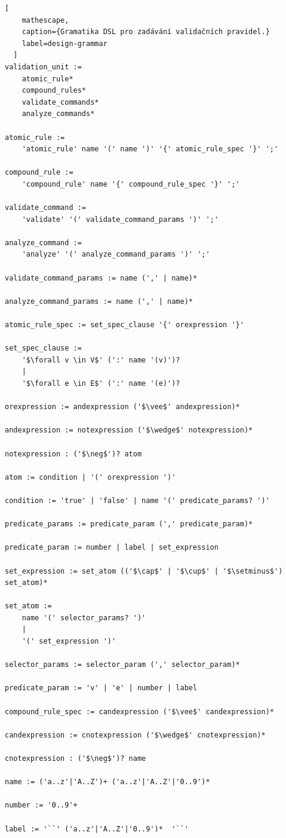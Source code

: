 \begin{lstlisting}[
    mathescape,
    caption={Gramatika DSL pro zadávání validačních pravidel.}
    label=design-grammar
  ]
validation_unit :=
    atomic_rule*
    compound_rules*
    validate_commands*
    analyze_commands*

atomic_rule :=
    'atomic_rule' name '(' name ')' '{' atomic_rule_spec '}' ';'

compound_rule :=
    'compound_rule' name '{' compound_rule_spec '}' ';'

validate_command :=
    'validate' '(' validate_command_params ')' ';'

analyze_command :=
    'analyze' '(' analyze_command_params ')' ';'

validate_command_params := name (',' | name)*

analyze_command_params := name (',' | name)*

atomic_rule_spec := set_spec_clause '{' orexpression '}'

set_spec_clause :=
    '$\forall v \in V$' (':' name '(v)')?
    |
    '$\forall e \in E$' (':' name '(e)')?

orexpression := andexpression ('$\vee$' andexpression)*

andexpression := notexpression ('$\wedge$' notexpression)*

notexpression : ('$\neg$')? atom

atom := condition | '(' orexpression ')'

condition := 'true' | 'false' | name '(' predicate_params? ')'

predicate_params := predicate_param (',' predicate_param)*

predicate_param := number | label | set_expression

set_expression := set_atom (('$\cap$' | '$\cup$' | '$\setminus$') set_atom)*

set_atom :=
    name '(' selector_params? ')'
    |
    '(' set_expression ')'

selector_params := selector_param (',' selector_param)*

predicate_param := 'v' | 'e' | number | label

compound_rule_spec := candexpression ('$\vee$' candexpression)*

candexpression := cnotexpression ('$\wedge$' cnotexpression)*

cnotexpression : ('$\neg$')? name

name := ('a..z'|'A..Z')+ ('a..z'|'A..Z'|'0..9')*

number := '0..9'+

label := '``' ('a..z'|'A..Z'|'0..9')*  '``'

\end{lstlisting}

